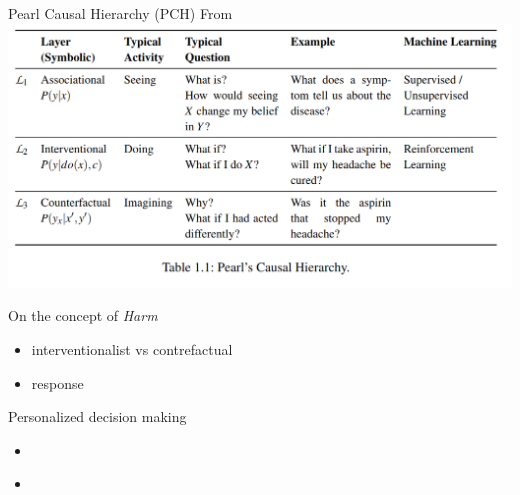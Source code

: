 \documentclass{beamer}
\begin{document}
\begin{frame}{Pearl Causal Hierarchy (PCH) }
  From \cite{bareinboim2022pearl}
	\includegraphics[scale=0.3]{PCH}
\end{frame}

\begin{frame}{On the concept of \emph{Harm}} 
  \begin{itemize}
    \item \cite{sarvet2023perspective}  interventionalist vs contrefactual  
    \item \cite{mueller2024perspective} response 
  \end{itemize}
\end{frame}


\begin{frame}{Personalized decision making}
  \begin{itemize}
    \item \cite{mueller2023personalized} 
    \item \cite{tian2000probabilities} 
  \end{itemize}
\end{frame}
\end{document}
